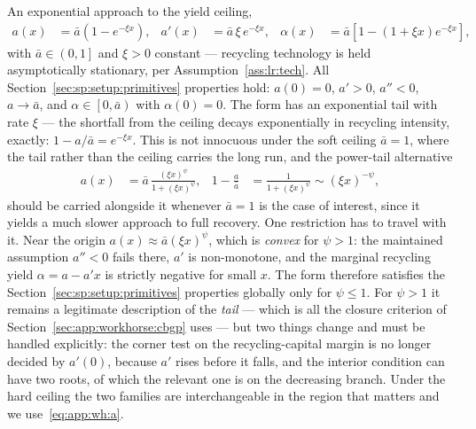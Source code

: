  An exponential approach to the yield ceiling,
\begin{align}
a\left(x\right) &= \bar a\left(1-e^{-\xi x}\right),
&
a'\left(x\right) &= \bar a\,\xi\,e^{-\xi x},
&
\alpha\left(x\right) &= \bar a\left[1-\left(1+\xi x\right)e^{-\xi x}\right],
\label{eq:app:wh:a}
\end{align}
with $\bar a\in\left(0,1\right]$ and $\xi>0$ constant --- recycling technology is held asymptotically stationary, per Assumption~\ref{ass:lr:tech}. All Section~\ref{sec:sp:setup:primitives} properties hold: $a\left(0\right)=0$, $a'>0$, $a''<0$, $a\to\bar a$, and $\alpha\in\left[0,\bar a\right)$ with $\alpha\left(0\right)=0$. The form has an exponential tail with rate $\xi$ --- the shortfall from the ceiling decays exponentially in recycling intensity, exactly: $1-a/\bar a=e^{-\xi x}$. This is not innocuous under the soft ceiling $\bar a=1$, where the tail rather than the ceiling carries the long run, and the power-tail alternative
\begin{align}
a\left(x\right) &= \bar a\,\frac{\left(\xi x\right)^{\psi}}{1+\left(\xi x\right)^{\psi}},
&
1-\frac{a}{\bar a} &= \frac{1}{1+\left(\xi x\right)^{\psi}}\sim\left(\xi x\right)^{-\psi},
\label{eq:app:wh:a-power}
\end{align}
should be carried alongside it whenever $\bar a=1$ is the case of interest, since it yields a much
slower approach to full recovery. One restriction has to travel with it. Near the origin
$a\left(x\right)\approx\bar a\left(\xi x\right)^{\psi}$, which is \emph{convex} for $\psi>1$: the
maintained assumption $a''<0$ fails there, $a'$ is non-monotone, and the marginal recycling yield
$\alpha=a-a'x$ is strictly negative for small $x$. The form therefore satisfies the
Section~\ref{sec:sp:setup:primitives} properties globally only for $\psi\le1$. For $\psi>1$ it
remains a legitimate description of the \emph{tail} --- which is all the closure criterion of
Section~\ref{sec:app:workhorse:cbgp} uses --- but two things change and must be handled explicitly:
the corner test on the recycling-capital margin is no longer decided by $a'\left(0\right)$, because
$a'$ rises before it falls, and the interior condition can have two roots, of which the relevant one
is on the decreasing branch. Under the hard ceiling the two families are interchangeable in the
region that matters and we use~\eqref{eq:app:wh:a}.

